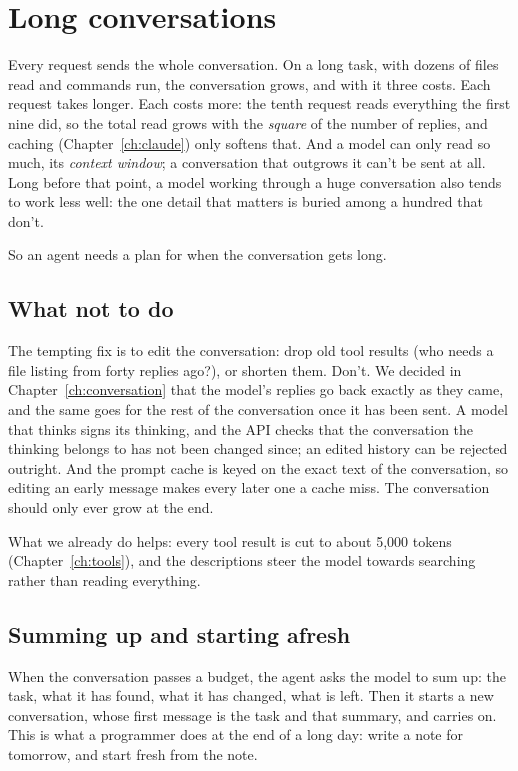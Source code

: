 \chapter{Long conversations}\label{ch:long}

Every request sends the whole conversation. On a long task, with dozens of
files read and commands run, the conversation grows, and with it three
costs. Each request takes longer. Each costs more: the tenth request reads
everything the first nine did, so the total read grows with the
\emph{square} of the number of replies, and caching (Chapter~\ref{ch:claude})
only softens that. And a model can only read so much, its \emph{context
window}; a conversation that outgrows it can't be sent at all. Long before
that point, a model working through a huge conversation also tends to work
less well: the one detail that matters is buried among a hundred that
don't.

So an agent needs a plan for when the conversation gets long.

\section{What not to do}

The tempting fix is to edit the conversation: drop old tool results (who
needs a file listing from forty replies ago?), or shorten them. Don't. We
decided in Chapter~\ref{ch:conversation} that the model's replies go back
exactly as they came, and the same goes for the rest of the conversation
once it has been sent. A model that thinks signs its thinking, and the
API checks that the conversation the thinking belongs to has not been
changed since; an edited history can be rejected outright. And the prompt
cache is keyed on the exact text of the conversation, so editing an early
message makes every later one a cache miss. The conversation should only
ever grow at the end.

What we already do helps: every tool result is cut to about 5,000 tokens
(Chapter~\ref{ch:tools}), and the descriptions steer the model towards
searching rather than reading everything.

\section{Summing up and starting afresh}

When the conversation passes a budget, the agent asks the model to sum up:
the task, what it has found, what it has changed, what is left. Then it
starts a new conversation, whose first message is the task and that
summary, and carries on. This is what a programmer does at the end of a
long day: write a note for tomorrow, and start fresh from the note.

